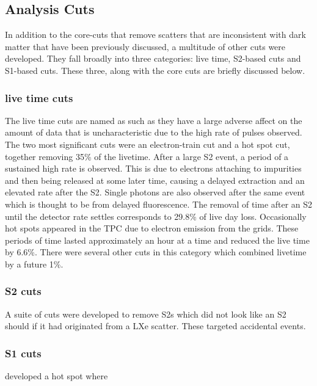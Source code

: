 \subsection{Analysis Cuts}
\par
In addition to the core-cuts that remove scatters that are inconsistent with dark matter that have been previously discussed, a multitude of other cuts were developed.
They fall broadly into three categories: live time, S2-based cuts and S1-based cuts.
These three, along with the core cuts are briefly discussed below.

\subsubsection{live time cuts}
The live time cuts are named as such as they have a large adverse affect on the amount of data that is uncharacteristic due to the high rate of pulses observed.
The two most significant cuts were an electron-train cut and a hot spot cut, together removing 35\% of the livetime.
After a large S2 event, a period of a sustained high rate is observed. 
This is due to electrons attaching to impurities and then being released at some later time, causing a delayed extraction and an elevated rate after the S2.
Single photons are also observed after the same event which is thought to be from delayed fluorescence.
The removal of time after an S2 until the detector rate settles corresponds to 29.8\% of live day loss.
Occasionally hot spots appeared in the TPC due to electron emission from the grids. 
These periods of time lasted approximately an hour at a time and reduced the live time by 6.6\%.
There were several other cuts in this category which combined livetime by a future 1\%.

\subsubsection{S2 cuts}
A suite of cuts were developed to remove S2s which did not look like an S2 should if it had originated from a LXe scatter.
These targeted accidental events.

\subsubsection{S1 cuts}


developed a hot spot where 

